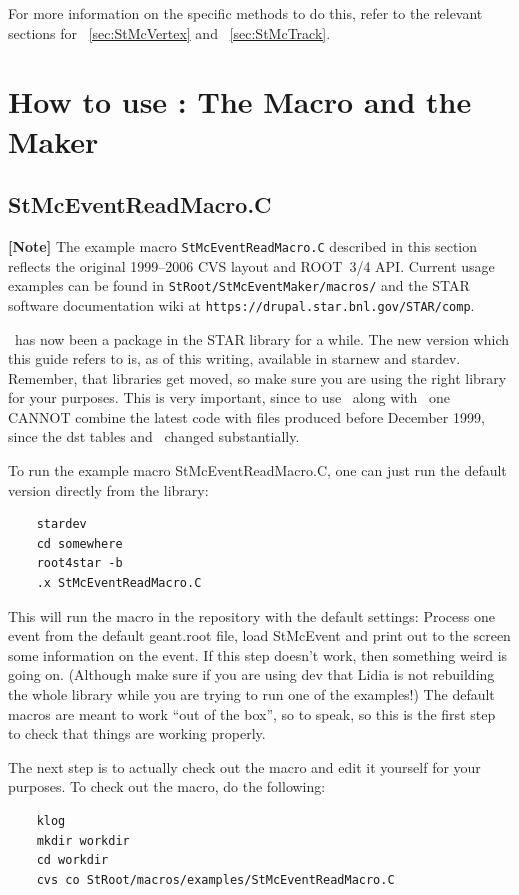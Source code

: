 For more information on the specific methods to do this, refer to the relevant sections for
 ~\ref{sec:StMcVertex} and   ~\ref{sec:StMcTrack}.


\section{How to use \StMcEvent: The Macro and the Maker}
\label{sec:howto}
\subsection{StMcEventReadMacro.C}
\textbf{[Note]} The example macro \texttt{StMcEventReadMacro.C} described in
this section reflects the original 1999--2006 CVS layout and ROOT~3/4 API.
Current usage examples can be found in
\texttt{StRoot/StMcEventMaker/macros/} and the STAR software documentation
wiki at \texttt{https://drupal.star.bnl.gov/STAR/comp}.

\StMcEvent\ has now been a package in the STAR library for a while.  The
new version which this guide refers to is, as of this writing,
available in starnew and stardev.  Remember, that libraries
get moved, so make sure you are using the right library for
your purposes.  This is very important, since to use \StMcEvent\
along with \StEvent\ one CANNOT combine the latest code with
files produced before December 1999, since the dst tables
and \StEvent\ changed substantially.

To run the example macro StMcEventReadMacro.C, one can just
run the default version directly from the library:
\begin{verbatim}
    stardev
    cd somewhere
    root4star -b
    .x StMcEventReadMacro.C
\end{verbatim}
This will run the macro in the repository with the default settings:
Process one event from the default geant.root file, load StMcEvent
and print out to the screen some information on the event.
If this step doesn't work, then something weird is going on.  (Although
make sure if you are using dev that Lidia is not rebuilding the whole
library while you are trying to run one of the examples!)  The
default macros are meant to work ``out of the box'', so to speak,
so this is the first step to check that things are working
properly.

The next step is to actually check out the macro and edit it yourself for
your purposes.  To check out the macro, do the following:
\begin{verbatim}
    klog
    mkdir workdir
    cd workdir
    cvs co StRoot/macros/examples/StMcEventReadMacro.C
\end{verbatim}

